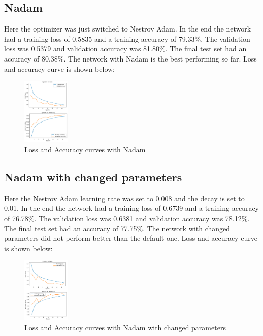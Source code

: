\documentclass[conference]{IEEEtran}
\begin{document}
    \subsection{Nadam}

    Here the optimizer was just switched to Nestrov Adam. In the end the network had a training loss of
    0.5835 and a training accuracy of 79.33\%. The validation loss was 0.5379 and validation accuracy was 81.80\%. The final test set had
    an accuracy of 80.38\%. The network with Nadam is the best performing so far. Loss and accuracy curve is shown below:

    \begin{figure}[H]
        \centering
        \captionsetup{justification=centering}
        \centering
            \includegraphics[width=0.2\textwidth]{17.png}
            \caption{Loss and Accuracy curves with Nadam}
    \end{figure}

    \subsection{Nadam with changed parameters}

    Here the Nestrov Adam learning rate was set to 0.008 and the decay is set to 0.01. In the end the network had a training loss of
    0.6739 and a training accuracy of 76.78\%. The validation loss was 0.6381 and validation accuracy was 78.12\%. The final test set had
    an accuracy of 77.75\%. The network with changed parameters did not perform better than the default one. Loss and accuracy curve is shown below:

    \begin{figure}[H]
        \centering
        \captionsetup{justification=centering}
        \centering
            \includegraphics[width=0.2\textwidth]{18.png}
            \caption{Loss and Accuracy curves with Nadam with changed parameters}
    \end{figure}
\end{document}
